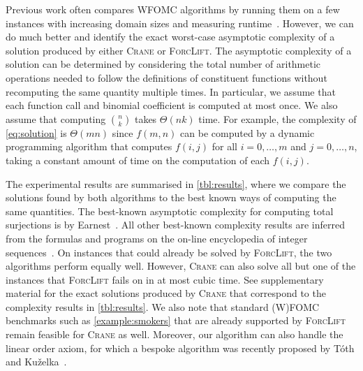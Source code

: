 \documentclass{article}
\theoremstyle{definition}
\theoremstyle{remark}
\begin{document}

Previous work often compares WFOMC algorithms by running them on a few instances
with increasing domain sizes and measuring
runtime~\cite{DBLP:conf/nips/Broeck11,DBLP:conf/ijcai/BroeckTMDR11,DBLP:conf/aaai/BroeckD12}.
However, we can do much better and identify the exact worst-case asymptotic
complexity of a solution produced by either \textsc{Crane} or \textsc{ForcLift}.
The asymptotic complexity of a solution can be determined by considering the
total number of arithmetic operations needed to follow the definitions of
constituent functions without recomputing the same quantity multiple times. In
particular, we assume that each function call and binomial coefficient is
computed at most once. We also assume that computing $\binom{n}{k}$ takes
$\Theta(nk)$ time. For example, the complexity of \cref{eq:solution} is
$\Theta(mn)$ since $f(m, n)$ can be computed by a dynamic programming algorithm
that computes $f(i, j)$ for all $i = 0, \dots, m$ and $j = 0, \dots, n$, taking
a constant amount of time on the computation of each $f(i, j)$.

The experimental results are summarised in \cref{tbl:results}, where we compare
the solutions found by both algorithms to the best known ways of computing the
same quantities. The best-known asymptotic complexity for computing total
surjections is by Earnest~. All other best-known complexity
results are inferred from the formulas and programs on the on-line encyclopedia
of integer sequences~\cite{oeis}. On instances that could already be solved by
\textsc{ForcLift}, the two algorithms perform equally well. However,
\textsc{Crane} can also solve all but one of the instances that
\textsc{ForcLift} fails on in at most cubic time. See supplementary material for
the exact solutions produced by \textsc{Crane} that correspond to the complexity
results in \cref{tbl:results}. We also note that standard (W)FOMC benchmarks
such as \cref{example:smokers} that are already supported by \textsc{ForcLift}
remain feasible for \textsc{Crane} as well. Moreover, our algorithm can also
handle the linear order axiom, for which a bespoke algorithm was recently
proposed by T{\'{o}}th and
Ku\v{z}elka~.
\end{document}

